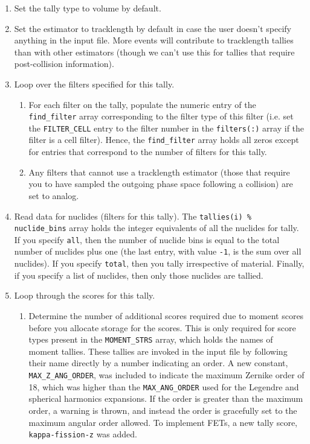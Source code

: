 \documentclass[10pt]{article}
\numberwithin{equation}{section} %
\begin{document}
\begin{enumerate}
\begin{enumerate}
	\item Set the tally type to volume by default. 
	\item Set the estimator to tracklength by default in case the user doesn't specify anything in the input file. More events will contribute to tracklength tallies than with other estimators (though we can't use this for tallies that require post-collision information).
	\item Loop over the filters specified for this tally.	
		\begin{enumerate}
		\item For each filter on the tally, populate the numeric entry of the {\tt find\_filter} array corresponding to the filter type of this filter (i.e. set the {\tt FILTER\_CELL} entry to the filter number in the {\tt filters(:)} array if the filter is a cell filter). Hence, the {\tt find\_filter} array holds all zeros except for entries that correspond to the number of filters for this tally.
		\item Any filters that cannot use a tracklength estimator (those that require you to have sampled the outgoing phase space following a collision) are set to analog.
		\end{enumerate}
	\item Read data for nuclides (filters for this tally). The {\tt tallies(i) \% nuclide\_bins} array holds the integer equivalents of all the nuclides for tally. If you specify {\tt all}, then the number of nuclide bins is equal to the total number of nuclides plus one (the last entry, with value {\tt -1}, is the sum over all nuclides). If you specify {\tt total}, then you tally irrespective of material. Finally, if you specify a list of nuclides, then only those nuclides are tallied.
	\item Loop through the scores for this tally.
		
		\begin{enumerate}
		\item Determine the number of additional scores required due to moment scores before you allocate storage for the scores. This is only required for score types present in the {\tt MOMENT\_STRS} array, which holds the names of moment tallies. These tallies are invoked in the input file by following their name directly by a number indicating an order. A new constant, {\tt MAX\_Z\_ANG\_ORDER}, was included to indicate the maximum Zernike order of 18, which was higher than the {\tt MAX\_ANG\_ORDER} used for the Legendre and spherical harmonics expansions. If the order is greater than the maximum order, a warning is thrown, and instead the order is gracefully set to the maximum angular order allowed. To implement FETs, a new tally score, {\tt kappa-fission-z} was added.


\end{enumerate}
\end{enumerate}
\end{enumerate}
\end{document}
